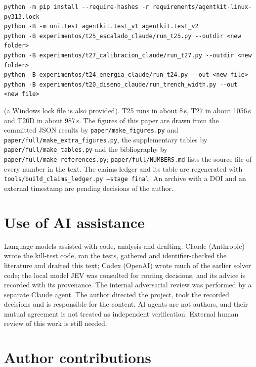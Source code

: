\documentclass[11pt,a4paper]{article}
\begin{document}
\begin{small}
\begin{verbatim}
python -m pip install --require-hashes -r requirements/agentkit-linux-py313.lock
python -B -m unittest agentkit.test_v1 agentkit.test_v2
python -B experimentos/t25_escalado_claude/run_t25.py --outdir <new folder>
python -B experimentos/t27_calibracion_claude/run_t27.py --outdir <new folder>
python -B experimentos/t24_energia_claude/run_t24.py --out <new file>
python -B experimentos/t20_diseno_claude/run_trench_width.py --out <new file>
\end{verbatim}
\end{small}

\noindent (a Windows lock file is also provided). T25 runs in about 8\,s, T27 in about 1056\,s and T20D in about 987\,s. The figures of this paper are drawn from the committed JSON results by \texttt{paper/make\_figures.py} and \texttt{paper/full/make\_extra\_figures.py}, the supplementary tables by \texttt{paper/full/make\_tables.py} and the bibliography by \texttt{paper/full/make\_references.py}; \texttt{paper/full/NUMBERS.md} lists the source file of every number in the text. The claims ledger and its table are regenerated with \texttt{tools/build\_claims\_ledger.py --stage final}. An archive with a DOI and an external timestamp are pending decisions of the author.

\section*{Use of AI assistance}

Language models assisted with code, analysis and drafting. Claude (Anthropic) wrote the kill-test code, ran the tests, gathered and identifier-checked the literature and drafted this text; Codex (OpenAI) wrote much of the earlier solver code; the local model JEV was consulted for routing decisions, and its advice is recorded with its provenance. The internal adversarial review was performed by a separate Claude agent. The author directed the project, took the recorded decisions and is responsible for the content. AI agents are not authors, and their mutual agreement is not treated as independent verification. External human review of this work is still needed.

\section*{Author contributions}
\end{document}
